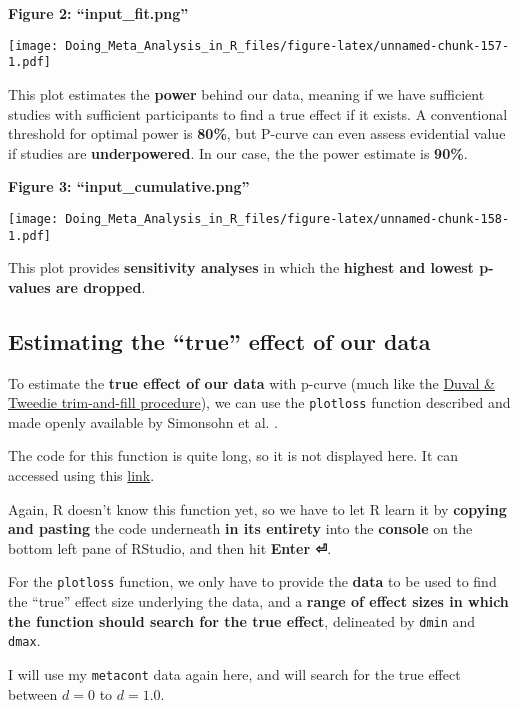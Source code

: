 \documentclass[]{book}
\theoremstyle{definition}
\theoremstyle{definition}
\theoremstyle{definition}
\theoremstyle{remark}
\begin{document}
\textbf{Figure 2: ``input\_fit.png''}

\texttt{[image: Doing\_Meta\_Analysis\_in\_R\_files/figure-latex/unnamed-chunk-157-1.pdf]}

This plot estimates the \textbf{power} behind our data, meaning if we
have sufficient studies with sufficient participants to find a true
effect if it exists. A conventional threshold for optimal power is
\textbf{80\%}, but P-curve can even assess evidential value if studies
are \textbf{underpowered}. In our case, the the power estimate is
\textbf{90\%}.

\textbf{Figure 3: ``input\_cumulative.png''}

\texttt{[image: Doing\_Meta\_Analysis\_in\_R\_files/figure-latex/unnamed-chunk-158-1.pdf]}

This plot provides \textbf{sensitivity analyses} in which the
\textbf{highest and lowest p-values are dropped}.

\subsection{\texorpdfstring{Estimating the ``true'' effect of our
data}{Estimating the true effect of our data}}\label{estimating-the-true-effect-of-our-data}

To estimate the \textbf{true effect of our data} with p-curve (much like
the \protect\hyperlink{dant}{Duval \& Tweedie trim-and-fill procedure}),
we can use the \texttt{plotloss} function described and made openly
available by Simonsohn et al. \citep{simonsohn2014pb}.

The code for this function is quite long, so it is not displayed here.
It can accessed using this
\href{https://github.com/MathiasHarrer/Doing-Meta-Analysis-in-R/blob/master/true_effect_estimation.R}{link}.

Again, R doesn't know this function yet, so we have to let R learn it by
\textbf{copying and pasting} the code underneath \textbf{in its
entirety} into the \textbf{console} on the bottom left pane of RStudio,
and then hit \textbf{Enter ⏎}.

For the \texttt{plotloss} function, we only have to provide the
\textbf{data} to be used to find the ``true'' effect size underlying the
data, and a \textbf{range of effect sizes in which the function should
search for the true effect}, delineated by \texttt{dmin} and
\texttt{dmax}.

I will use my \texttt{metacont} data again here, and will search for the
true effect between \(d=0\) to \(d=1.0\).
\end{document}

